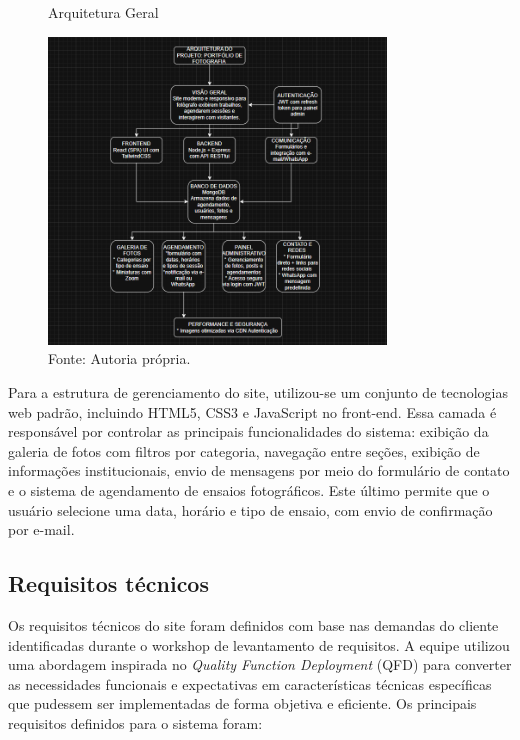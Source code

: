  \begin{figure} [h!]	
    \centering

    \caption{Arquitetura Geral}
    \includegraphics[width=0.8\textwidth]{Figures/Arquitetura_do_projeto.png}
    \caption*{Fonte: Autoria própria.}
    \label{fig:Arquitetura geral}
\end{figure}	

Para a estrutura de gerenciamento do site, utilizou-se um conjunto de tecnologias web padrão, incluindo HTML5, CSS3 e JavaScript no front-end. Essa camada é responsável por controlar as principais funcionalidades do sistema: exibição da galeria de fotos com filtros por categoria, navegação entre seções, exibição de informações institucionais, envio de mensagens por meio do formulário de contato e o sistema de agendamento de ensaios fotográficos. Este último permite que o usuário selecione uma data, horário e tipo de ensaio, com envio de confirmação por e-mail.

\subsection{Requisitos técnicos}
Os requisitos técnicos do site foram definidos com base nas demandas do cliente identificadas durante o workshop de levantamento de requisitos. A equipe utilizou uma abordagem inspirada no \textit{Quality Function Deployment} (QFD) para converter as necessidades funcionais e expectativas em características técnicas específicas que pudessem ser implementadas de forma objetiva e eficiente. Os principais requisitos definidos para o sistema foram:

